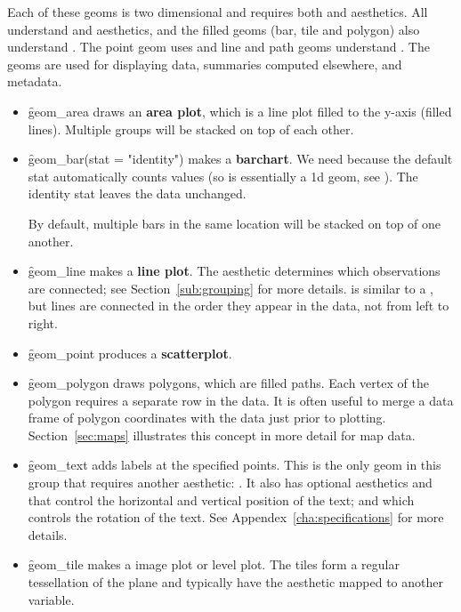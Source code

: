 Each of these geoms is two dimensional and requires both  and  aesthetics.  All understand  and  aesthetics, and the filled geoms (bar, tile and polygon) also understand .  The point geom uses  and line and path geoms understand . The geoms are used for displaying data, summaries computed elsewhere, and metadata.

\begin{itemize}
  \item \f{geom_area} draws an \textbf{area plot}, which is a line plot filled to the y-axis (filled lines).  Multiple groups will be stacked on top of each other.
  
  \item \f{geom_bar(stat = "identity")} makes a \textbf{barchart}. We need  because the default stat automatically counts values (so is essentially a 1d geom, see ). The identity stat leaves the data unchanged.  
  
  By default, multiple bars in the same location will be stacked on top of one another.
  
  \item \f{geom_line} makes a \textbf{line plot}.  The  aesthetic determines which observations are connected; see Section~\ref{sub:grouping} for more details.  is similar to a , but lines are connected in the order they appear in the data, not from left to right.  
  
  \item \f{geom_point} produces a \textbf{scatterplot}.
  
  \item \f{geom_polygon} draws polygons, which are filled paths.  Each vertex of the polygon requires a separate row in the data.  It is often useful to merge a data frame of polygon coordinates with the data just prior to plotting.  Section~\ref{sec:maps} illustrates this concept in more detail for map data.
  
  \item \f{geom_text} adds labels at the specified points.  This is the only geom in this group that requires another aesthetic: .  It also has optional aesthetics  and  that control the horizontal and vertical position of the text; and  which controls the rotation of the text.  See Appendex~\ref{cha:specifications} for more details.
  
  \item \f{geom_tile} makes a image plot or level plot.  The tiles form a regular tessellation of the plane and typically have the  aesthetic mapped to another variable.

\end{itemize}

